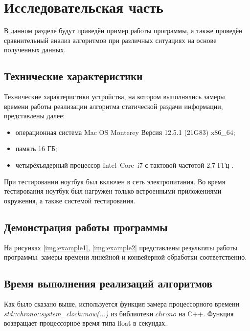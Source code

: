 \chapter{Исследовательская часть}

В данном разделе будут приведён пример работы программы, а также проведён сравнительный анализ алгоритмов при различных ситуациях на основе полученных данных.

\section{Технические характеристики}

Технические характеристики устройства, на котором выполнялись замеры времени работы реализации алгоритма статической раздачи информации, представлены далее:

\begin{itemize}[label=---]
	\item операционная система Mac OS Monterey Версия 12.5.1 (21G83) \cite{macos} x86\_64;
	\item память 16 ГБ;
	\item четырёхъядерный процессор Intel Core i7 с тактовой частотой 2,7 ГГц \cite{intel}.
\end{itemize}

При тестировании ноутбук был включен в сеть электропитания. Во время тестирования ноутбук был нагружен только встроенными приложениями окружения, а также системой тестирования.

\section{Демонстрация работы программы}

На рисунках \ref{img:example1}, \ref{img:example2} представлены результаты работы программы: замеры времени линейной и конвейерной обработки соответственно.

\clearpage

\section{Время выполнения реализаций алгоритмов}

Как было сказано выше, используется функция замера процессорного времени \textit{std::chrono::system\_clock::now(...)} из библиотеки $chrono$ на C++. Функция возвращает процессорное время типа float в секундах.

